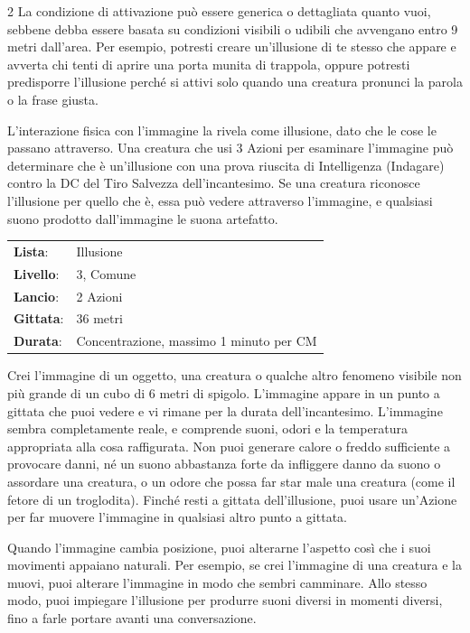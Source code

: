 \begin{multicols}{2}
La condizione di attivazione può essere generica o dettagliata quanto vuoi, sebbene debba essere basata su condizioni visibili o udibili che avvengano entro 9 metri dall'area. Per esempio, potresti creare un'illusione di te stesso che appare e avverta chi tenti di aprire una porta munita di trappola, oppure potresti predisporre l'illusione perché si attivi solo quando una creatura pronunci la parola o la frase giusta.

L'interazione fisica con l'immagine la rivela come illusione, dato che le cose le passano attraverso. Una creatura che usi 3 Azioni per esaminare l'immagine può determinare che è un'illusione con una prova riuscita di Intelligenza (Indagare) contro la DC del Tiro Salvezza dell'incantesimo. Se una creatura riconosce l'illusione per quello che è, essa può vedere attraverso l'immagine, e qualsiasi suono prodotto dall'immagine le suona artefatto.

\noindent\begin{tabularx}{\linewidth}{p{1.9cm}X}
	\rowcolor{gray!20}\textbf{Lista}: & Illusione \\
	\textbf{Livello}: & 3, Comune \\
	\rowcolor{gray!20}\textbf{Lancio}: & 2 Azioni \\
	\textbf{Gittata}: & 36 metri \\
	\rowcolor{gray!20}\textbf{Durata}: & Concentrazione, massimo 1 minuto per CM \\
\end{tabularx}\smallskip

Crei l'immagine di un oggetto, una creatura o qualche altro fenomeno visibile non più grande di un cubo di 6 metri di spigolo. L'immagine appare in un punto a gittata che puoi vedere e vi rimane per la durata dell'incantesimo. L'immagine sembra completamente reale, e comprende suoni, odori e la temperatura appropriata alla cosa raffigurata. Non puoi generare calore o freddo sufficiente a provocare danni, né un suono abbastanza forte da infliggere danno da suono o assordare una creatura, o un odore che possa far star male una creatura (come il fetore di un troglodita). Finché resti a gittata dell'illusione, puoi usare un'Azione per far muovere l'immagine in qualsiasi altro punto a gittata.

Quando l'immagine cambia posizione, puoi alterarne l'aspetto così che i suoi movimenti appaiano naturali. Per esempio, se crei l'immagine di una creatura e la muovi, puoi alterare l'immagine in modo che sembri camminare. Allo stesso modo, puoi impiegare l'illusione per produrre suoni diversi in momenti diversi, fino a farle portare avanti una conversazione.


\end{multicols}

